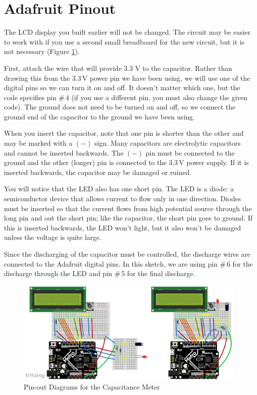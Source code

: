 \documentclass[]{article}
\begin{document}
\section{Adafruit Pinout}

The LCD display you built earlier will not be changed.  The circuit may be easier to work with if you use a second small breadboard for the new circuit, but it is not necessary (Figure \ref{pinout}).  

First, attach the wire that will provide 3.3 V to the capacitor.  Rather than drawing this from the 3.3\,V power pin we have been using, we will use one of the digital pins so we can turn it on and off.  It doesn't matter which one, but the code specifies pin \#\,4 (if you use a different pin, you must also change the given code).  The ground does not need to be turned on and off, so we connect the ground end of the capacitor to the ground we have been using.  

When you insert the capacitor, note that one pin is shorter than the other and may be marked with a \((-)\) sign.  Many capacitors are electrolytic capacitors and cannot be inserted backwards.  The \((-)\) pin must be connected to the ground and the other (longer) pin is connected to the 3.3\,V power supply.  If it is inserted backwards, the capacitor may be damaged or ruined.  %

You will notice that the LED also has one short pin.  The LED is a diode: a semiconductor device that allows current to flow only in one direction.  Diodes must be inserted so that the current flows from high potential source through the long pin and out the short pin; like the capacitor, the short pin goes to ground.  If this is inserted backwards, the LED won't light, but it also won't be damaged unless the voltage is quite large.  

Since the discharging of the capacitor must be controlled, the discharge wires are connected to the Adafruit digital pins.  In this sketch, we are using pin \#\,6 for the discharge through the LED and pin \#\,5 for the final discharge.



	\begin{figure}[h]
		\centering
		\includegraphics[width=16cm]{pics/Metro Breadboard.png}
		\caption{Pin-out Diagrams for the Capacitance Meter}
		\label{pinout}
	\end{figure}
\end{document}
